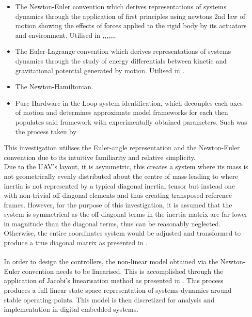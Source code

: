 \documentclass[12pt,a4paper,twoside]{report}
\begin{document}
				\begin{itemize}
					\item
						The Newton-Euler convention which derives representations of systems dynamics through the application of first principles using newtons 2nd law of motion showing the effects of forces applied to the rigid body by its actuators and environment. Utilised in \cite{2},\cite{3},\cite{5},\cite{6},\cite{7},\cite{8},\cite{9}.
					\item 
						The Euler-Lagrange convention which derives representations of systems dynamics through the study of energy differentials between kinetic and gravitational potential generated by motion. Utilised in \cite{4}. 
					\item 
						The Newton-Hamiltonian.
					\item 
						Pure Hardware-in-the-Loop system identification, which decouples each axes of motion and determines approximate model frameworks for each then populates said framework with experimentally obtained parameters. Such was the process taken by \cite{28}
				\end{itemize}
				\space
				This investigation utilises the Euler-angle representation and the Newton-Euler convention due to its intuitive familiarity and relative simplicity.
				\\
				Due to the UAV's layout, it is asymmetric, this creates a system where its mass is not geometrically evenly distributed about the centre of mass leading to where inertia is not represented by a typical diagonal inertial tensor but instead one with non-trivial off diagonal elements and thus creating transposed reference frames. However, for the purpose of this investigation, it is assumed that the system is symmetrical as the off-diagonal terms in the inertia matrix are far lower in magnitude than the diagonal terms, thus can be reasonably neglected. Otherwise, the entire coordinates system would be adjusted and transformed to produce a true diagonal matrix as presented in \cite{10}. 
				\\ \\
				In order to design the controllers, the non-linear model obtained via the Newton-Euler convention needs to be linearised. This is accomplished through the application of Jacobi’s linearisation method as presented in \cite{11}. This process produces a full linear state space representation of systems dynamics around stable operating points. This model is then discretized for analysis and implementation in digital embedded systems.
				
\end{document}
